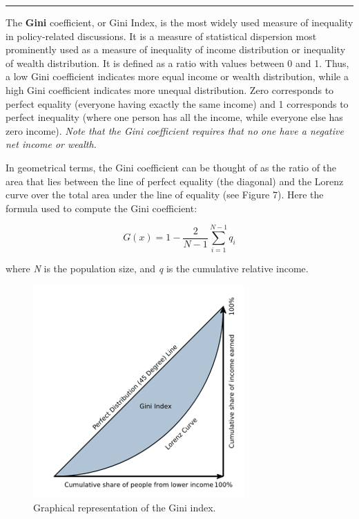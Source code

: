 \documentclass[
]{svmono}
\begin{document}
\begin{center}\rule{0.5\linewidth}{0.5pt}\end{center}

The \textbf{Gini} coefficient, or Gini Index, is the most widely used measure
of inequality in policy-related discussions. It is a measure of
statistical dispersion most prominently used as a measure of inequality
of income distribution or inequality of wealth distribution. It is
defined as a ratio with values between 0 and 1. Thus, a low Gini
coefficient indicates more equal income or wealth distribution, while a
high Gini coefficient indicates more unequal distribution. Zero
corresponds to perfect equality (everyone having exactly the same
income) and 1 corresponds to perfect inequality (where one person has
all the income, while everyone else has zero income). \emph{Note that the
Gini coefficient requires that no one have a negative net income or
wealth.}

In geometrical terms, the Gini coefficient can be thought of as the
ratio of the area that lies between the line of perfect equality (the
diagonal) and the Lorenz curve over the total area under the line of
equality (see Figure 7). Here the formula used to compute the Gini
coefficient:

\begin{equation}
G(x)=1-\frac{2}{N-1}\sum^{N-1}_{i=1}{q_i}
\label{eq:gini}
\end{equation}

where \emph{N} is the population size, and \emph{q} is the cumulative relative
income.

\begin{figure}[H]

{\centering \includegraphics[width=0.5\linewidth,]{images/gini} 

}

\caption{Graphical representation of the Gini index.}\label{fig:unnamed-chunk-42}
\end{figure}
\end{document}

